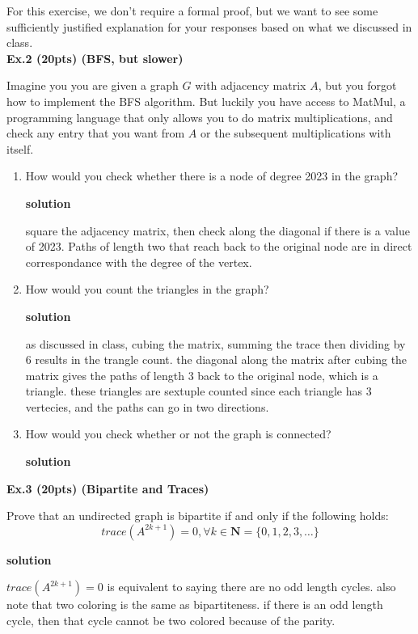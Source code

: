 \documentclass{article}
\newcommand{\sol}{\textbf{solution}}
\begin{document}
\newpage
For this exercise, we don't require a formal proof, but we want to see some sufficiently justified explanation for your responses based on what we discussed in class.\\


\noindent \textbf{Ex.2 (20pts) (BFS, but slower)}

Imagine you you are given a graph $G$ with adjacency matrix $A$, but you forgot how to implement the BFS algorithm. But luckily you have access to MatMul, a programming language that only allows you to do matrix multiplications, and check any entry that you want from $A$ or the subsequent multiplications with itself.

\begin{enumerate}
    \item How would you check whether there is a node of degree 2023 in the graph?
    
    \sol

    square the adjacency matrix, then check along the diagonal if there is a value of 2023. Paths of length two that reach back to the original node are in direct correspondance with the degree of the vertex. 

    \item How would you count the triangles in the graph?
    
    \sol

    as discussed in class, cubing the matrix, summing the trace then dividing by 6 results in the trangle count. the diagonal along the matrix after cubing the matrix gives the paths of length 3 back to the original node, which is a triangle. these triangles are sextuple counted since each triangle has 3 vertecies, and the paths can go in two directions. 

    \item How would you check whether or not the graph is connected?
    
    \sol 




\end{enumerate}

\newpage

\noindent \textbf{Ex.3 (20pts) (Bipartite and Traces)}

Prove that an undirected graph is bipartite if and only if the following holds:
\[
trace(A^{2k+1})=0, \forall k\in \mathbf{N}=\{0,1,2,3,\ldots\}
\]

\sol 

\(trace(A^{2k+1})=0\) is equivalent to saying there are no odd length cycles. also note that two coloring is the same as bipartiteness. if there is an odd length cycle, then that cycle cannot be two colored because of the parity. 
\end{document}
